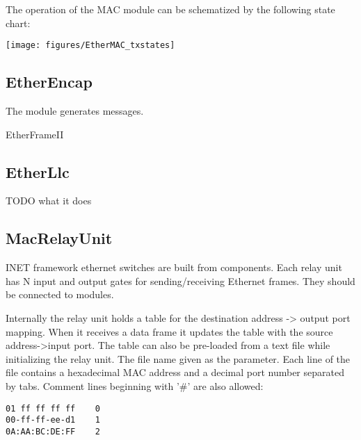 The operation of the MAC module can be schematized by the following state chart:

\begin{center}
\texttt{[image: figures/EtherMAC\_txstates]}
\end{center}


\subsection{EtherEncap}

The  module generates  messages.

EtherFrameII

\subsection{EtherLlc}

TODO what it does





\subsection{MacRelayUnit}

INET framework ethernet switches are built from 
components. Each relay unit has N input and output gates for sending/receiving
Ethernet frames. They should be connected to  modules.

Internally the relay unit holds a table for the destination address -> output
port mapping. When it receives a data frame it updates the table with the
source address->input port. The table can also be pre-loaded from a text file
while initializing the relay unit. The file name given as the 
parameter. Each line of the file contains a hexadecimal MAC address and a decimal port
number separated by tabs. Comment lines beginning with '\#' are also allowed:

\begin{verbatim}
01 ff ff ff ff    0
00-ff-ff-ee-d1    1
0A:AA:BC:DE:FF    2
\end{verbatim}

